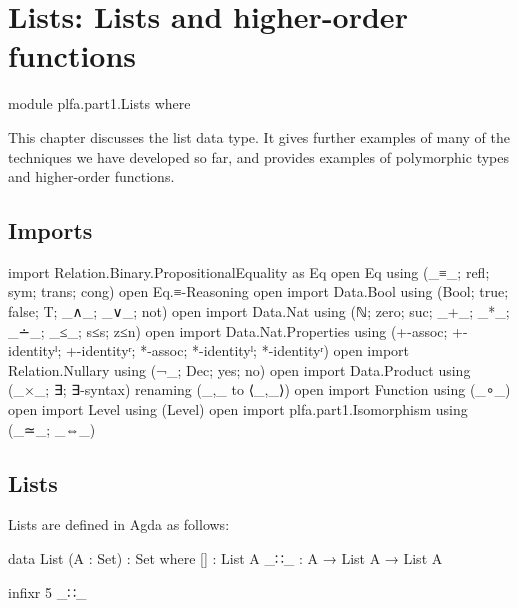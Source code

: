 \hypertarget{Lists}{%
\chapter{Lists: Lists and higher-order functions}\label{Lists}}

\begin{fence}
\begin{code}
module plfa.part1.Lists where
\end{code}
\end{fence}

This chapter discusses the list data type. It gives further examples of
many of the techniques we have developed so far, and provides examples
of polymorphic types and higher-order functions.

\hypertarget{imports}{%
\section{Imports}\label{imports}}

\begin{fence}
\begin{code}
import Relation.Binary.PropositionalEquality as Eq
open Eq using (_≡_; refl; sym; trans; cong)
open Eq.≡-Reasoning
open import Data.Bool using (Bool; true; false; T; _∧_; _∨_; not)
open import Data.Nat using (ℕ; zero; suc; _+_; _*_; _∸_; _≤_; s≤s; z≤n)
open import Data.Nat.Properties using
  (+-assoc; +-identityˡ; +-identityʳ; *-assoc; *-identityˡ; *-identityʳ)
open import Relation.Nullary using (¬_; Dec; yes; no)
open import Data.Product using (_×_; ∃; ∃-syntax) renaming (_,_ to ⟨_,_⟩)
open import Function using (_∘_)
open import Level using (Level)
open import plfa.part1.Isomorphism using (_≃_; _⇔_)
\end{code}
\end{fence}

\hypertarget{lists}{%
\section{Lists}\label{lists}}

Lists are defined in Agda as follows:

\begin{fence}
\begin{code}
data List (A : Set) : Set where
  []  : List A
  _∷_ : A → List A → List A

infixr 5 _∷_
\end{code}
\end{fence}

